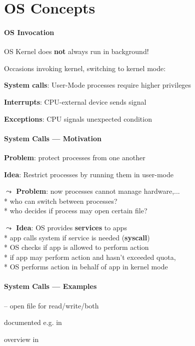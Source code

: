 \section{OS Concepts}

\paragraph{OS Invocation}
\begin{items}
	\item OS Kernel does \textbf{not} always run in background!
	\item Occasions invoking kernel, switching to kernel mode:
	\begin{enumeration}
		\item \textbf{System calls}: User-Mode processes require higher privileges
		\item \textbf{Interrupts}: CPU-external device sends signal
		\item \textbf{Exceptions}: CPU signals unexpected condition
	\end{enumeration}
\end{items}

\paragraph{System Calls --- Motivation}
\begin{items}
	\item \textbf{Problem}: protect processes from one another
	\item \textbf{Idea}: Restrict processes by running them in user-mode
	\item \textbf{\( \leadsto \) Problem}: now processes cannot manage hardware,... \\*
		who can switch between processes? \\*
		who decides if process may open certain file?
	\item \textbf{\( \leadsto \) Idea}: OS provides \textbf{services} to apps \\*
		app calls system if service is needed (\textbf{syscall}) \\*
		OS checks if app is allowed to perform action \\*
		if app may perform action and hasn't exceeded quota, \\* \phantom{x} OS performs action in behalf of app in kernel mode
\end{items}

\paragraph{System Calls --- Examples}
\begin{items}
	\item {} -- open file for read/write/both
	\item documented e.g. in 
	\item overview in 
\end{items}

